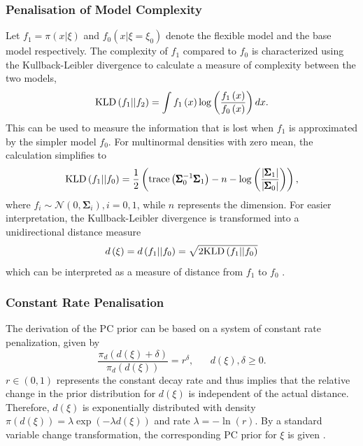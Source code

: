 \subsubsection*{Penalisation of Model Complexity} 
Let $f_1=\pi\left(x|\xi\right)$ and $f_0\left(x|\xi=\xi_0\right)$ denote the flexible model and the base model respectively. The complexity of $f_1$ compared to $f_0$ is characterized using the Kullback-Leibler divergence \autocite[][]{kullback1951information} to calculate a measure of complexity between the two models,
\begin{equation}
    \hbox{KLD}\left(f_1||f_2\right) = \int f_1\left(x\right)\log\left(\frac{f_1\left(x\right)}{f_0\left(x\right)}\right)dx.
\end{equation}
This can be used to measure the information that is lost when $f_1$ is approximated by the simpler model $f_0$. For multinormal densities with zero mean, the calculation simplifies to
\begin{equation}
    \hbox{KLD}\left(f_1||f_0\right) = \frac{1}{2}\left(\hbox{trace}\left(\pmb{\Sigma}_0^{-1}\pmb{\Sigma}_1\right)-n-\log\left(\frac{\left|\pmb{\Sigma}_1\right|}{\left|\pmb{\Sigma}_0\right|}\right)\right),
\end{equation}
where $f_i\sim\mathcal{N}\left(0,\pmb{\Sigma}_i\right), i=0,1$, while $n$ represents the dimension. For easier interpretation, the Kullback-Leibler divergence is transformed into a unidirectional distance measure
\begin{equation}
    d\left(\xi\right) = d\left(f_1||f_0\right)=\sqrt{2\hbox{KLD}\left(f_1||f_0\right)}
\end{equation}
which can be interpreted as a measure of distance from $f_1$ to $f_0$ \autocite[][]{sorbye2017penalised}.
\subsubsection*{Constant Rate Penalisation}
The derivation of the PC prior can be based on a system of constant rate penalization, given by
\begin{equation}
    \frac{\pi_d\left(d\left(\xi\right)+\delta\right)}{\pi_d\left(d\left(\xi\right)\right)}=r^{\delta}, \hspace{20pt} d\left(\xi\right),\delta\geq0.
\end{equation}
$r\in\left(0,1\right)$ represents the constant decay rate and thus implies that the relative change in the prior distribution for $d\left(\xi\right)$ is independent of the actual distance. Therefore, $d\left(\xi\right)$ is exponentially distributed with density $\pi\left(d\left(\xi\right)\right)=\lambda\exp\left(-\lambda d\left(\xi\right)\right)$ and rate $\lambda = -\ln\left(r\right)$. By a standard variable change transformation, the corresponding PC prior for $\xi$ is given \autocite[][]{sorbye2017penalised}. \clearpage
